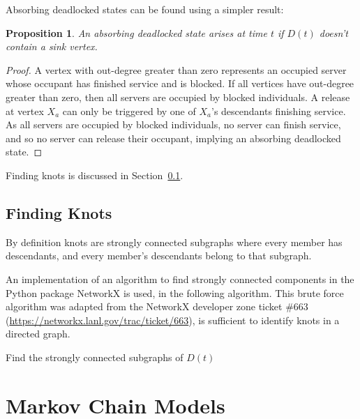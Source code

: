 \documentclass{article}
\newtheorem{proposition}{Proposition}
\begin{document}
Absorbing deadlocked states can be found using a simpler result:\\

\begin{proposition}
An absorbing deadlocked state arises at time $t$ if $D(t)$ doesn't contain a sink vertex.
\end{proposition}

\begin{proof}
A vertex with out-degree greater than zero represents an occupied server whose occupant has finished service and is blocked.
If all vertices have out-degree greater than zero, then all servers are occupied by blocked individuals.
A release at vertex $X_a$ can only be triggered by one of $X_a$'s descendants finishing service.
As all servers are occupied by blocked individuals, no server can finish service, and so no server can release their occupant, implying an absorbing deadlocked state.

\end{proof}

Finding knots is discussed in Section~\ref{sec:findknots}.

\subsection{Finding Knots}\label{sec:findknots}

By definition knots are strongly connected subgraphs where every member has descendants, and every member's descendants belong to that subgraph.

An implementation of an algorithm to find strongly connected components in the Python package NetworkX is used, in the following algorithm.
This brute force algorithm was adapted from the NetworkX developer zone ticket \#663 (\url{https://networkx.lanl.gov/trac/ticket/663}), is sufficient to identify knots in a directed graph.

\begin{algorithm}[H]
    \DontPrintSemicolon
    Find the strongly connected subgraphs of $D(t)$\;
    \;
\end{algorithm}



\section{Markov Chain Models}\label{sec:markovmodels}
\end{document}
